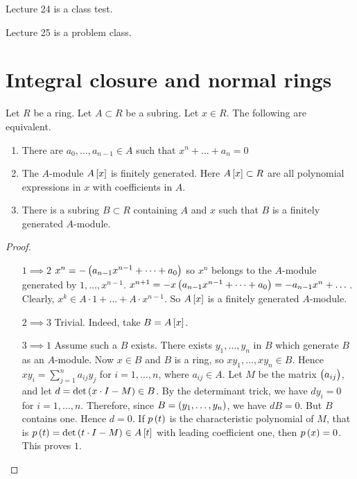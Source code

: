 
Lecture 24 is a class test.


Lecture 25 is a problem class.

\pagebreak

\section{Integral closure and normal rings}


\begin{theorem}
\label{thm:13.1}
Let $ R $ be a ring. Let $ A \subset R $ be a subring. Let $ x \in R $. The following are equivalent.
\begin{enumerate}
\item There are $ a_0, \dots, a_{n - 1} \in A $ such that $ x^n + \dots + a_n = 0 $
\item The $ A $-module $ A\sbr{x} $ is finitely generated. Here $ A\sbr{x} \subset R $ are all polynomial expressions in $ x $ with coefficients in $ A $.
\item There is a subring $ B \subset R $ containing $ A $ and $ x $ such that $ B $ is a finitely generated $ A $-module.
\end{enumerate}
\end{theorem}

\begin{proof}
\hfill
\begin{itemize}[leftmargin=0.5in]
\item[$ 1 \implies 2 $] $ x^n = -\br{a_{n - 1}x^{n - 1} + \dots + a_0} $ so $ x^n $ belongs to the $ A $-module generated by $ 1, \dots, x^{n - 1} $. $ x^{n + 1} = -x\br{a_{n - 1}x^{n - 1} + \dots + a_0} = -a_{n - 1}x^n + \dots $. Clearly, $ x^k \in A \cdot 1 + \dots + A \cdot x^{n - 1} $. So $ A\sbr{x} $ is a finitely generated $ A $-module.
\item[$ 2 \implies 3 $] Trivial. Indeed, take $ B = A\sbr{x} $.
\item[$ 3 \implies 1 $] Assume such a $ B $ exists. There exists $ y_1, \dots, y_n $ in $ B $ which generate $ B $ as an $ A $-module. Now $ x \in B $ and $ B $ is a ring, so $ xy_1, \dots, xy_n \in B $. Hence $ xy_i = \sum_{j = 1}^n a_{ij}y_j $ for $ i = 1, \dots, n $, where $ a_{ij} \in A $. Let $ M $ be the matrix $ \br{a_{ij}} $, and let $ d = \det\br{x \cdot I - M} \in B $. By the determinant trick, we have $ dy_i = 0 $ for $ i = 1, \dots, n $. Therefore, since $ B = \br{y_1, \dots, y_n} $, we have $ dB = 0 $. But $ B $ contains one. Hence $ d = 0 $. If $ p\br{t} $ is the characteristic polynomial of $ M $, that is $ p\br{t} = \det\br{t \cdot I - M} \in A\sbr{t} $ with leading coefficient one, then $ p\br{x} = 0 $. This proves $ 1 $.
\end{itemize}
\end{proof}

